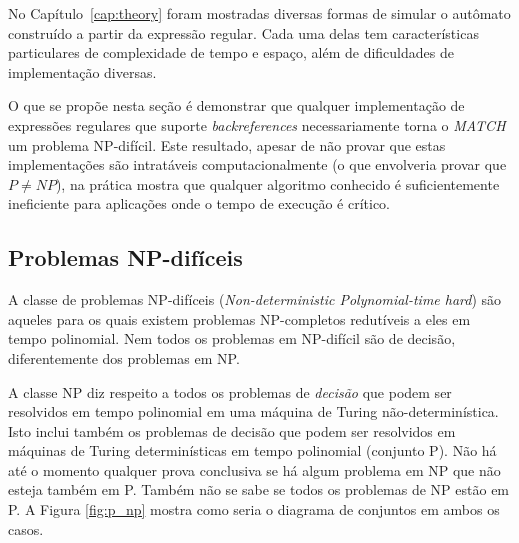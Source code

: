 \documentclass[a4paper,12pt,oneside,onecolumn]{uerj}
\begin{document}
No Capítulo~\ref{cap:theory} foram mostradas diversas formas de simular o autômato construído a partir da expressão regular. Cada uma delas tem características particulares de complexidade de tempo e espaço, além de dificuldades de implementação diversas.

O que se propõe nesta seção é demonstrar que qualquer implementação de expressões regulares que suporte \emph{backreferences} necessariamente torna o \emph{MATCH} um problema NP-difícil. Este resultado, apesar de não provar que estas implementações são intratáveis computacionalmente (o que envolveria provar que $P \neq NP$), na prática mostra que qualquer algoritmo conhecido é suficientemente ineficiente para aplicações onde o tempo de execução é crítico.

\subsection{Problemas NP-difíceis}

A classe de problemas NP-difíceis (\emph{Non-deterministic Polynomial-time hard}) são aqueles para os quais existem problemas NP-completos redutíveis a eles em tempo polinomial. Nem todos os problemas em NP-difícil são de decisão, diferentemente dos problemas em NP.

A classe NP diz respeito a todos os problemas de \emph{decisão} que podem ser resolvidos em tempo polinomial em uma máquina de Turing não-determinística. Isto inclui também os problemas de decisão que podem ser resolvidos em máquinas de Turing determinísticas em tempo polinomial (conjunto P). Não há até o momento qualquer prova conclusiva se há algum problema em NP que não esteja também em P. Também não se sabe se todos os problemas de NP estão em P. A Figura \ref{fig:p_np} mostra como seria o diagrama de conjuntos em ambos os casos.
\end{document}
